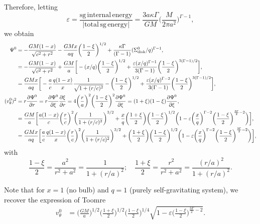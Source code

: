 \documentclass[11pt]{article}
\newcommand{\vt}{v_{\theta}}
\newcommand{\Sigmad}{\Sigma_{\rm{disk}}}
\begin{document}
Therefore, letting  $$\varepsilon = \frac{\mathrm{sg \, internal \, energy}}{|\mathrm{total \,sg \,   energy}|} =\frac{3a \kappa \Gamma}{GM} \bigg(\frac{M}{2\pi a^2}\bigg)^{\Gamma-1},$$  we obtain
\begin{align*}
\Psi^0 &=  - \frac{G M (1-x)}{\sqrt{c^2+r^2}}-\frac{G M x}{a q}\bigg(\frac{1-\xi}{2}\bigg)^{1/2} + \frac{\kappa \Gamma}{(\Gamma-1)} (\Sigmad^0/q)^{\Gamma-1} ,\\
{}&=  -\frac{G M (1-x)}{\sqrt{c^2+r^2}}+\frac{G M }{a} \bigg[-(x/q)\bigg(\frac{1-\xi}{2}\bigg)^{1/2} + \frac{\varepsilon(x/q)^{\Gamma-1}}{3(\Gamma-1)}\bigg(\frac{1-\xi}{2}\bigg)^{3(\Gamma-1)/2} \bigg] ,\\
&=  \frac{G Mx}{aq}\bigg[-\frac{a}{c}\frac{q (1-x)}{x}\frac{1}{ \sqrt{1+(r/c)^2}} -\bigg(\frac{1-\xi}{2}\bigg)^{1/2} + \frac{\varepsilon(x/q)^{\Gamma-2}}{3(\Gamma-1)}\bigg(\frac{1-\xi}{2}\bigg)^{3(\Gamma-1)/2} \bigg],\\
(\vt^0)^2 &= r \frac{\partial \Psi^0}{\partial r} =r \frac{\partial \Psi^0}{\partial \xi} \frac{\partial \xi}
{\partial r} = 4\bigg(\frac{r}{a}\bigg)^2    \bigg(\frac{1-\xi}{2}\bigg)^2 \frac{\partial \Psi^0}{\partial \xi}= (1+\xi) (1-\xi) \frac{\partial \Psi^0}{\partial \xi}  ,\\
&=\frac{GM}{a}\bigg[\frac{a(1-x)}{c}\bigg( \frac{r}{c}\bigg)^2 \bigg(\frac{1}{1+(r/c)^2}\bigg)^{3/2} 
+ \frac{x}{q}\bigg(\frac{1+\xi}{2}\bigg) \bigg(\frac{1-\xi}{2}\bigg)^{1/2}  \bigg(1- \varepsilon\bigg(\frac{x}{q}\bigg)^{\Gamma-2}\bigg(\frac{1-\xi}{2}\bigg)^{\frac{3\Gamma}{2}-2} \bigg) \bigg], \\
&=\frac{GMx}{aq}\bigg[\frac{a}{c}\frac{q(1-x)}{x}\bigg( \frac{r}{c}\bigg)^2 \bigg(\frac{1}{1+(r/c)^2}\bigg)^{3/2} 
+ \bigg(\frac{1+\xi}{2}\bigg) \bigg(\frac{1-\xi}{2}\bigg)^{1/2}  \bigg(1- \varepsilon\bigg(\frac{x}{q}\bigg)^{\Gamma-2}\bigg(\frac{1-\xi}{2}\bigg)^{\frac{3\Gamma}{2}-2} \bigg) \bigg],
\end{align*}
with
$$\frac{1-\xi}{2}= \frac{a^2}{r^2+a^2}= \frac{1}{1+(r/a)^2}; \quad \frac{1+\xi}{2}= \frac{r^2}{r^2+a^2}= \frac{(r/a)^2}{1+(r/a)^2}.$$

Note that for $x=1$ (no bulb) and $q=1$ (purely self-gravitating system), we recover the expression of Toomre
\begin{align*}
\vt^0 &=\bigg(\frac{GM}{a} \bigg)^{1/2}\bigg(\frac{1+\xi}{2}\bigg)^{1/2} \bigg(\frac{1-\xi}{2}\bigg)^{1/4}  \sqrt{1- \varepsilon \bigg(\frac{1-\xi}{2}\bigg)^{\frac{3\Gamma}{2}-2}} .
\end{align*}
\end{document}
